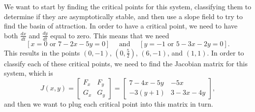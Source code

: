\documentclass{ximera}
\begin{document}
\begin{exampleSol}
    We want to start by finding the critical points for this system, classifying them to determine if they are asymptotically stable, and then use a slope field to try to find the basin of attraction. In order to have a critical point, we need to have both $\frac{dx}{dt}$ and $\frac{dy}{dt}$ equal to zero. This means that we need
    \begin{equation*}
        \left[ x=0 \text{ or } 7-2x-5y = 0\right] \quad \text{ and } \quad \left[ y=-1 \text{ or } 5 - 3x - 2y = 0 \right]. 
    \end{equation*}
    This results in the points $(0, -1)$, $\left(0, \frac{5}{2}\right)$, $(6, -1)$, and $(1, 1)$. In order to classify each of these critical points, we need to find the Jacobian matrix for this system, which is
    \begin{equation*}
        J(x,y) = \begin{bmatrix} F_x & F_y \\ G_x & G_y \end{bmatrix} = \begin{bmatrix} 7-4x-5y & -5x \\ -3(y+1) & 3 - 3x - 4y \end{bmatrix},
    \end{equation*}
    and then we want to plug each critical point into this matrix in turn. 


\end{exampleSol}
\end{document}
